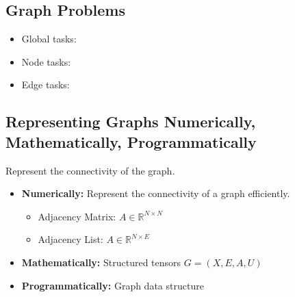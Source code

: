 \subsection{Graph Problems}
\begin{notes}
    \begin{itemize}
        \item Global tasks:
        \item Node tasks:
        \item Edge tasks:
    \end{itemize}
\end{notes}
\newpage

\subsection{Representing Graphs Numerically, Mathematically, Programmatically}
\begin{notes} Represent the connectivity of the graph.
    \begin{itemize}
        \item \textbf{Numerically:} Represent the connectivity of a graph efficiently.  
        \begin{itemize}
            \item Adjacency Matrix: $A \in \mathbb{R}^{N \times N}$
            \item Adjacency List: $A \in \mathbb{R}^{N \times E}$
        \end{itemize}
        \item \textbf{Mathematically:} Structured tensors $G = (X,E,A,U)$
        \item \textbf{Programmatically:} Graph data structure
    \end{itemize}
\end{notes}